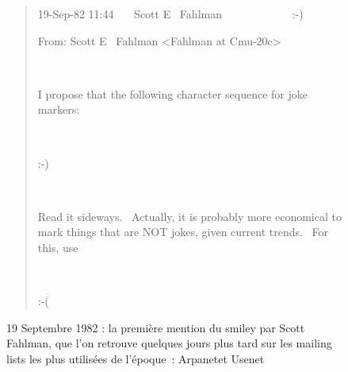 \begin{figure}[ht]
    \centering
    

    \begin{quote}
    19-Sep-82 11:44~~~ Scott E~ Fahlman~~~~~~~~~~~~ :-)

    From: Scott E~ Fahlman {\textless}Fahlman at Cmu-20c{\textgreater}

    ~
    
    I propose that the following character sequence for joke markers:

    ~~~~~~~ 

    :-)

    ~~~~~~~ 
    
    Read it sideways.~ Actually, it is probably more economical to mark things that are NOT jokes, given current trends.~ For this, use

    ~~~~~~~ 

    :-(

    \end{quote}
    \caption[la première mention du smiley par Scott Fahlman]{19 Septembre 1982 : la première mention du smiley par Scott Fahlman\protect\footnotemark, que l’on retrouve quelques jours plus tard sur les mailing lists les plus utilisées de l’époque : Arpanet\protect\footnotemark  et Usenet \protect\footnotemark}
    \label{fig:smiley-story}
\end{figure}


